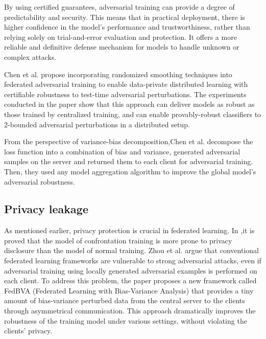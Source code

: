\documentclass[conference]{IEEEtran}
\begin{document}
By using certified guarantees, adversarial training can provide a degree of predictability and security. 
This means that in practical deployment, there is higher confidence in the model's performance and trustworthiness, 
rather than relying solely on trial-and-error evaluation and protection. 
It offers a more reliable and definitive defense mechanism for models to handle unknown or complex attacks.  

Chen et al.\cite{b104} propose incorporating randomized smoothing techniques into federated adversarial
training to enable data-private distributed learning with certifiable robustness to test-time adversarial
perturbations. The experiments conducted in the paper show that this approach can deliver models as
robust as those trained by centralized training, and can enable provably-robust classifiers to
2-bounded adversarial perturbations in a distributed setup.

From the perspective of variance-bias decomposition,Chen et al.\cite{b108} decompose the 
loss function into a combination of bias and variance, generated adversarial samples on the server 
and returned them to each client for adversarial training. Then, they used any model aggregation 
algorithm to improve the global model's adversarial robustness.

\subsection{Privacy leakage} 
As mentioned earlier, privacy protection is crucial in federated learning.
In \cite{b106},it is proved that the model of confrontation training is more prone to
privacy disclosure than the model of normal training.
Zhou et al.\cite{b103} argue that conventional federated learning frameworks are vulnerable
to strong adversarial attacks, even if adversarial training using locally
generated adversarial examples is performed on each client. To address this
problem, the paper proposes a new framework called FedBVA (Federated Learning
with Bias-Variance Analysis) that provides a tiny amount of bias-variance
perturbed data from the central server to the clients through asymmetrical
communication. This approach dramatically improves the robustness of the
training model under various settings, without violating the clients' privacy.
\end{document}
